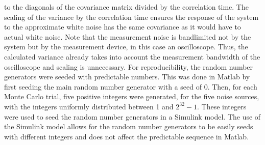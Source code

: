 \documentclass[../zhang_thesis.tex]{subfiles}
\begin{document}
to the diagonals of the covariance matrix divided by the correlation time. The scaling of the variance by the correlation time ensures the response of the system to the approximate white noise has the same covariance as it would have to actual white noise. Note that the measurement noise is bandlimited not by the system but by the measurement device, in this case an oscilloscope. Thus, the calculated variance already takes into account the measurement bandwidth of the oscilloscope and
scaling is unnecessary. For reproducibility, the random number generators were seeded with predictable numbers. This was done in Matlab by first seeding the main random number generator with a seed of 0. Then, for each Monte Carlo trial, five positive integers were generated, for the five noise sources, with the integers uniformly distributed between 1 and $2^{32}-1$. These integers were used to seed the random number generators in a Simulink model. The use of the Simulink model allows for the
random number generators to be easily seeds with different integers and does not affect the predictable sequence in Matlab.
\end{document}
